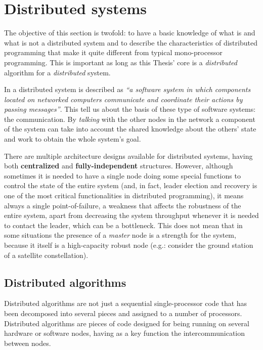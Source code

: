 
\section{Distributed systems}

The objective of this section is twofold: to have a basic knowledge of what is and what is not a distributed system and to describe the characteristics of distributed programming that make it quite different from typical mono-processor programming. This is important as long as this Thesis' core is a \emph{distributed} algorithm for a \emph{distributed} system.

In \cite{Coulouris:2011:DSC:2029110} a distributed system is described as \textit{``a software system in which components located on networked computers communicate and coordinate their actions by passing messages''}. This tell us about the basis of these type of software systems: the communication. By \emph{talking} with the other nodes in the network a component of the system can take into account the shared knowledge about the others' state and work to obtain the whole system's goal.

There are multiple architecture designs available for distributed systems, having both \textbf{centralized} and \textbf{fully-independent} structures. However, although sometimes it is needed to have a single node doing some special functions to control the state of the entire system (and, in fact, leader election and recovery is one of the most critical functionalities in distributed programming), it means always a single point-of-failure, a weakness that affects the robustness of the entire system, apart from decreasing the system throughput whenever it is needed to contact the leader, which can be a bottleneck. This does not mean that in some situations the presence of a \emph{master} node is a strength for the system, because it itself is a high-capacity robust node (e.g.: consider the ground station of a satellite constellation).

\subsection{Distributed algorithms}
 
Distributed algorithms are not just a sequential single-processor code that has been decomposed into several pieces and assigned to a number of processors. Distributed algorithms are pieces of code designed for being running on several hardware or software nodes, having as a key function the intercommunication between nodes.


